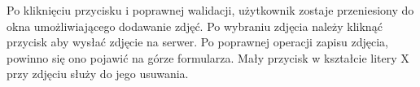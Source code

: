 \newpage

Po kliknięciu przycisku  i poprawnej walidacji, użytkownik zostaje przeniesiony do okna umożliwiającego dodawanie zdjęć. Po wybraniu zdjęcia należy kliknąć przycisk  aby wysłać zdjęcie na serwer. Po poprawnej operacji zapisu zdjęcia, powinno się ono pojawić na górze formularza. Mały przycisk w kształcie litery X przy zdjęciu służy do jego usuwania.\\
\\
\begin{minipage}{\linewidth}
\label{add-offer2}
\end{minipage}\\

\newpage

